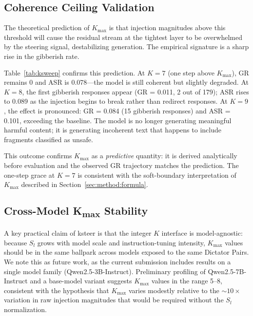 \documentclass[10pt]{article}
\begin{document}
\subsection{Coherence Ceiling Validation}
\label{sec:experiments:ceiling}

The theoretical prediction of $K_\text{max}$ is that injection magnitudes
above this threshold will cause the residual stream at the tightest layer
to be overwhelmed by the steering signal, destabilizing generation.  The
empirical signature is a sharp rise in the gibberish rate.

Table~\ref{tab:ksweep} confirms this prediction.  At $K = 7$ (one step
above $K_\text{max}$), GR remains 0 and ASR is 0.078---the model is still
coherent but slightly degraded.  At $K = 8$, the first gibberish responses
appear (GR = 0.011, 2 out of 179); ASR rises to 0.089 as the injection
begins to break rather than redirect responses.  At $K = 9$, the effect
is pronounced: GR = 0.084 (15 gibberish responses) and ASR = 0.101,
exceeding the baseline.  The model is no longer generating meaningful
harmful content; it is generating incoherent text that happens to include
fragments classified as unsafe.

This outcome confirms $K_\text{max}$ as a \emph{predictive} quantity: it
is derived analytically before evaluation and the observed GR trajectory
matches the prediction.  The one-step grace at $K = 7$ is consistent with
the soft-boundary interpretation of $K_\text{max}$ described in
Section~\ref{sec:method:formula}.

\subsection{Cross-Model K\textsubscript{max} Stability}
\label{sec:experiments:crossmodel}

A key practical claim of ksteer is that the integer $K$ interface is
model-agnostic: because $S_l$ grows with model scale and instruction-tuning
intensity, $K_\text{max}$ values should be in the same ballpark across
models exposed to the same Dictator Pairs.  We note this as future work,
as the current submission includes results on a single model family
(Qwen2.5-3B-Instruct).  Preliminary profiling of Qwen2.5-7B-Instruct
and a base-model variant suggests $K_\text{max}$ values in the range 5--8,
consistent with the hypothesis that $K_\text{max}$ varies modestly relative
to the $\sim$$10\times$ variation in raw injection magnitudes that would be
required without the $S_l$ normalization.
\end{document}

